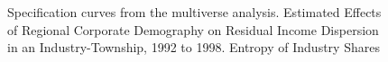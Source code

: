 \documentclass{article}
\begin{document}
\begin{figure}[htbp]
  \centering
  \caption{Specification curves from the multiverse analysis. Estimated Effects of Regional Corporate Demography on Residual Income Dispersion in an Industry-Township, 1992 to 1998.  Entropy of Industry Shares}
  \label{fig:gross_income}
  
\end{figure}



\clearpage %
\end{document}
